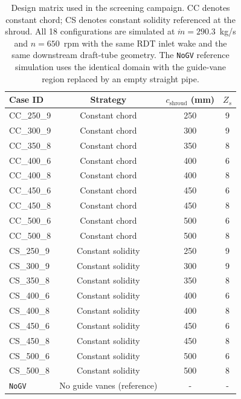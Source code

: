 \begin{table}[h!]
  \centering
  \caption[Design matrix used in the screening campaign]%
  {Design matrix used in the screening campaign. CC denotes constant chord; CS denotes constant solidity referenced at the shroud. All 18 configurations are simulated at $\dot m = 290.3$~kg/s and $n = 650$~rpm with the same RDT inlet wake and the same downstream draft-tube geometry. The \texttt{NoGV} reference simulation uses the identical domain with the guide-vane region replaced by an empty straight pipe.}
  \label{tab:design_matrix}
  \small
  \begin{tabular}{l|c|c|c}
    \toprule
    \textbf{Case ID} & \textbf{Strategy} & $c_{\mathrm{shroud}}$ (mm) & $Z_s$ \\
    \midrule
    CC\_250\_9  & Constant chord    & 250 & 9 \\
    CC\_300\_9  & Constant chord    & 300 & 9 \\
    CC\_350\_8  & Constant chord    & 350 & 8 \\
    CC\_400\_6  & Constant chord    & 400 & 6 \\
    CC\_400\_8  & Constant chord    & 400 & 8 \\
    CC\_450\_6  & Constant chord    & 450 & 6 \\
    CC\_450\_8  & Constant chord    & 450 & 8 \\
    CC\_500\_6  & Constant chord    & 500 & 6 \\
    CC\_500\_8  & Constant chord    & 500 & 8 \\
    \midrule
    CS\_250\_9  & Constant solidity & 250 & 9 \\
    CS\_300\_9  & Constant solidity & 300 & 9 \\
    CS\_350\_8  & Constant solidity & 350 & 8 \\
    CS\_400\_6  & Constant solidity & 400 & 6 \\
    CS\_400\_8  & Constant solidity & 400 & 8 \\
    CS\_450\_6  & Constant solidity & 450 & 6 \\
    CS\_450\_8  & Constant solidity & 450 & 8 \\
    CS\_500\_6  & Constant solidity & 500 & 6 \\
    CS\_500\_8  & Constant solidity & 500 & 8 \\
    \midrule
    \texttt{NoGV} & No guide vanes (reference) & - & - \\
    \bottomrule
  \end{tabular}
\end{table}
 
